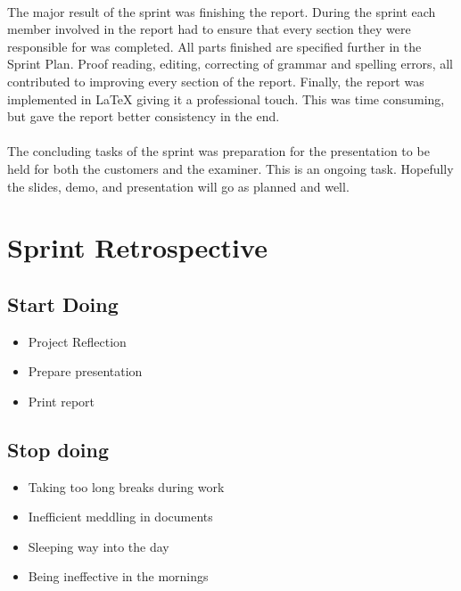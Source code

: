 \paragraph{} The major result of the sprint was finishing the report. During the sprint each member involved in the report had to ensure that every section they were responsible for was completed. All parts finished are specified further in the Sprint Plan. Proof reading, editing, correcting of grammar and spelling errors, all contributed to improving every section of the report. Finally, the report was implemented in LaTeX giving it a professional touch. This was time consuming, but gave the report better consistency in the end.

\paragraph{} The concluding tasks of the sprint was preparation for the presentation to be held for both the customers and the examiner. This is an ongoing task. Hopefully the slides, demo, and presentation will go as planned and well. 


\section{Sprint Retrospective}
\label{sec:FinalRetrospective}

\subsection{Start Doing}
\begin{itemize}
\item Project Reflection
\item Prepare presentation
\item Print report
\end{itemize}

\subsection{Stop doing}
\begin{itemize}
\item Taking too long breaks during work
\item Inefficient meddling in documents
\item Sleeping way into the day
\item Being ineffective in the mornings
\end{itemize}

